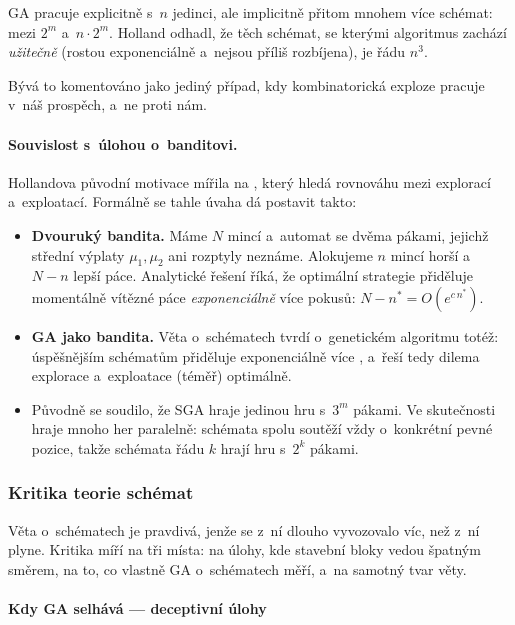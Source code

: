 \documentclass[11pt,a4paper]{article}
\theoremstyle{definition}
\begin{document}
\begin{defbox}
GA pracuje explicitně s~$n$ jedinci, ale implicitně přitom 
mnohem více schémat: mezi $2^m$ a~$n \cdot 2^m$. Holland odhadl, že těch schémat,
se kterými algoritmus zachází \emph{užitečně} (rostou exponenciálně a~nejsou
příliš rozbíjena), je řádu $n^3$.
\end{defbox}

Bývá to komentováno jako jediný případ, kdy kombinatorická exploze pracuje
v~náš prospěch, a~ne proti nám.

\paragraph{Souvislost s~úlohou o~banditovi.} Hollandova původní motivace mířila na
, který hledá rovnováhu mezi explorací a~exploatací. Formálně se
tahle úvaha dá postavit takto:
\begin{itemize}
\item \textbf{Dvouruký bandita.} Máme $N$ mincí a~automat se dvěma pákami, jejichž
  střední výplaty $\mu_1, \mu_2$ ani rozptyly neznáme. Alokujeme
  $n$ mincí horší a~$N-n$ lepší páce. Analytické řešení říká, že optimální
  strategie přiděluje momentálně vítězné páce \emph{exponenciálně} více pokusů:
  $N - n^* = O(e^{c\, n^*})$.
\item \textbf{GA jako bandita.} Věta o~schématech tvrdí o~genetickém algoritmu totéž:
  úspěšnějším schématům přiděluje exponenciálně více , a~řeší
  tedy dilema explorace a~exploatace (téměř) optimálně.
\item Původně se soudilo, že SGA hraje jedinou hru s~$3^m$ pákami. Ve
  skutečnosti hraje mnoho her paralelně: schémata spolu soutěží vždy o~konkrétní
  pevné pozice, takže schémata řádu $k$ hrají hru s~$2^k$ pákami.
\end{itemize}

\subsubsection{Kritika teorie schémat}

Věta o~schématech je pravdivá, jenže se z~ní dlouho vyvozovalo víc, než z~ní plyne.
Kritika míří na tři místa: na úlohy, kde stavební bloky vedou špatným směrem, na to,
co vlastně GA o~schématech měří, a~na samotný tvar věty.

\paragraph{Kdy GA selhává --- deceptivní úlohy}
\end{document}
